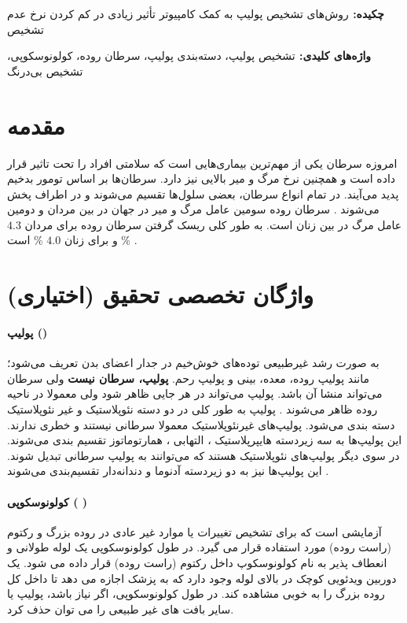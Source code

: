 \documentclass[11pt]{article}
\newcommand{\پاورقی}[1]{\footnote{\lr{#1}}}
\begin{document}



{\bf {چکيده: }}
روش‌های تشخیص پولیپ به کمک کامپیوتر تأثیر زیادی در کم کردن نرخ عدم تشخیص 

{\bf  { واژه‌های کلیدی: }}
تشخیص پولیپ، دسته‌بندی پولیپ، سرطان روده، کولونوسکوپی، تشخیص بی‌درنگ

\setlength{\parindent}{0.25in} %

\section{مقدمه}
امروزه سرطان یکی از مهم‌ترین بیماری‌هایی است که سلامتی افراد را تحت تاثیر قرار داده است و همچنین نرخ مرگ و میر بالایی نیز دارد. سرطان‌ها بر اساس تومور بدخیم پدید می‌آیند. در تمام انواع سرطان، بعضی سلول‌ها تقسیم می‌شوند و در اطراف پخش می‌شوند
\cite{pacal2020comprehensive}.
سرطان روده سومین عامل مرگ و میر در جهان در بین مردان و دومین عامل مرگ در بین زنان است. 
به طور کلی ریسک گرفتن سرطان روده برای مردان 
$4.3$ \%
و برای زنان 
$4.0$ \%
است
\cite{cancer_keystatistics}.



\section{واژگان تخصصی تحقیق (اختیاری)}

\paragraph{پولیپ ()}
به صورت رشد غیرطبیعی توده‌های خوش‌خیم در جدار اعضای بدن تعریف می‌شود؛ مانند پولیپ روده، معده، بینی و پولیپ رحم.
\textbf{پولیپ، سرطان نیست}
ولی سرطان می‌تواند منشا آن باشد. 
پولیپ می‌تواند در هر جایی ظاهر شود ولی معمولا در ناحیه روده ظاهر می‌شوند
\cite{Jha_2021}.
پولیپ به طور کلی در دو دسته نئوپلاستیک
و غیر نئوپلاستیک
دسته بندی می‌شود. پولیپ‌‌های غیرنئوپلاستیک معمولا سرطانی نیستند و خطری ندارند. این پولیپ‌ها به سه زیردسته هایپرپلاستیک 
،
التهابی 
، 
همارتوماتوز
تقسیم بندی می‌شوند. در سوی دیگر پولیپ‌های نئوپلاستیک هستند که می‌توانند به پولیپ سرطانی تبدیل شوند. این پولیپ‌ها نیز به دو زیردسته 
آدنوما
و
دندانه‌دار 
تقسیم‌بندی می‌شوند
\cite{Jha_2021}.


\paragraph{کولونوسکوپی 
	(
	)
} 
آزمایشی است که برای تشخیص تغییرات یا موارد غیر عادی در روده بزرگ و رکتوم (راست روده) مورد استفاده قرار می گیرد.
در طول کولونوسکوپی یک لوله طولانی و انعطاف پذیر به نام کولونوسکوپ داخل رکتوم (راست روده) قرار داده می شود. یک دوربین ویدئویی کوچک در بالای لوله وجود دارد که به پزشک اجازه می دهد تا داخل کل روده بزرگ را به خوبی مشاهده کند. در طول کولونوسکوپی، اگر نیاز باشد، پولیپ یا سایر بافت های غیر طبیعی را می توان حذف کرد. 
\end{document}
